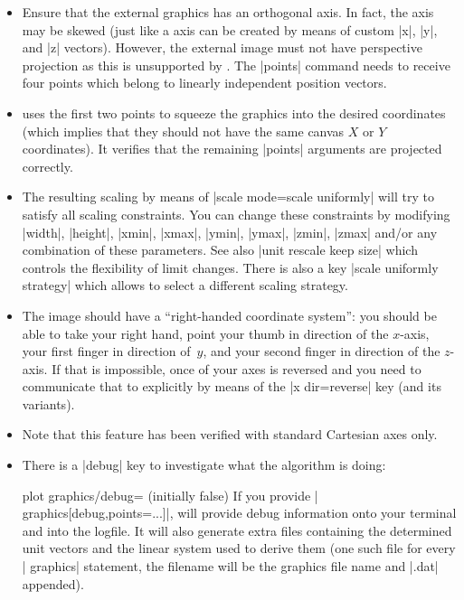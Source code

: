 {{\begin{itemize}
        The algorithm should detect any deficiencies. However, if you
        encounter strange ``Dimension too large'' messages here, you can try
        other arguments in |points|. Take a look into your logfile, it will
        probably indicate the source of problems (or use the |debug| key).
    \item Ensure that the external graphics has an orthogonal axis. In fact,
        the axis may be skewed (just like a \PGFPlots{} axis can be created
        by means of custom |x|, |y|, and |z| vectors). However, the external
        image must not have perspective projection as this is unsupported by
        \PGFPlots{}. The |points| command needs to receive four points which
        belong to linearly independent position vectors.
    \item \PGFPlots{} uses the first two points to squeeze the graphics into
        the desired coordinates (which implies that they should not have the
        same canvas $X$ or $Y$ coordinates). It verifies that the remaining
        |points| arguments are projected correctly.
    \item The resulting scaling by means of |scale mode=scale uniformly| will
        try to satisfy all scaling constraints. You can change these
        constraints by modifying |width|, |height|, |xmin|, |xmax|, |ymin|,
        |ymax|, |zmin|, |zmax| and/or any combination of these parameters.
        See also |unit rescale keep size| which controls the flexibility of
        limit changes. There is also a key |scale uniformly strategy| which
        allows to select a different scaling strategy.
    \item The image should have a ``right-handed coordinate system'': you
        should be able to take your right hand, point your thumb in direction
        of the $x$-axis, your first finger in direction of~$y$, and your
        second finger in direction of the $z$-axis. If that is impossible,
        once of your axes is reversed and you need to communicate that to
        \PGFPlots{} explicitly by means of the |x dir=reverse| key (and its
        variants).
    \item Note that this feature has been verified with standard Cartesian
        axes only.
    \item There is a |debug| key to investigate what the algorithm is doing:
        \begin{pgfplotskey}{plot graphics/debug= (initially false)}
            If you provide | graphics[debug,points={...}]|,
            \PGFPlots{} will provide debug information onto your terminal and
            into the logfile. It will also generate extra files containing the
            determined unit vectors and the linear system used to derive them
            (one such file for every | graphics| statement, the
            filename will be the graphics file name and |.dat| appended).


\end{pgfplotskey}
\end{itemize}}}
